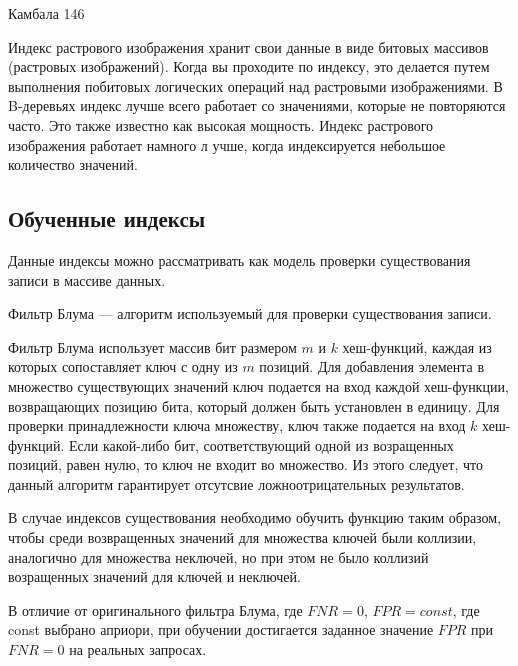 Камбала 146


Индекс растрового изображения хранит свои данные в виде битовых массивов
(растровых изображений). Когда вы проходите по индексу, это делается путем
выполнения побитовых логических операций над растровыми изображениями. В
B-деревьях индекс лучше всего работает со значениями, которые не повторяются
часто.  Это также известно как высокая мощность. Индекс растрового изображения
работает намного л учше, когда индексируется небольшое количество значений.

\subsection{Обученные индексы}

Данные индексы можно рассматривать как модель проверки существования записи в
массиве данных.

Фильтр Блума --- алгоритм используемый для проверки существования записи.

Фильтр Блума использует массив бит размером $m$ и $k$ хеш-функций, каждая из
которых сопоставляет ключ с одну из $m$ позиций. Для добавления элемента в
множество существующих значений ключ подается на вход каждой хеш-функции,
возвращающих позицию бита, который должен быть установлен в единицу. Для проверки
принадлежности ключа множеству, ключ также подается на вход $k$ хеш-функций.
Если какой-либо бит, соответствующий одной из возращенных позиций, равен нулю,
то ключ не входит во множество. Из этого следует, что данный алгоритм гарантирует
отсутсвие ложноотрицательных результатов.



В случае индексов существования необходимо обучить функцию таким образом, чтобы
среди возвращенных значений для множества ключей были коллизии, аналогично для
множества неключей, но при этом не было коллизий возращенных значений для ключей
и неключей. 

В отличие от оригинального фильтра Блума, где $FNR = 0$, $FPR = const$, где
const выбрано априори, при обучении достигается заданное значение $FPR$ при $FNR
= 0$ на реальных запросах.
